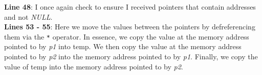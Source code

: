 \documentclass[../main.tex]{subfiles}
\begin{document}
	\textbf{Line 48}: I once again check to ensure I received pointers that contain addresses and not \textit{NULL}.\\
	\textbf{Lines 53 - 55}: Here we move the values between the pointers by defreferencing them via the \texttt{*} operator.  In essence, we copy the value at the memory address pointed to by \textit{p1} into temp.  We then copy the value at the memory address pointed to by \textit{p2} into the memory address pointed to by \textit{p1}.  Finally, we copy the value of temp into the memory address pointed to by \textit{p2}.\\
	
	
\end{document}
